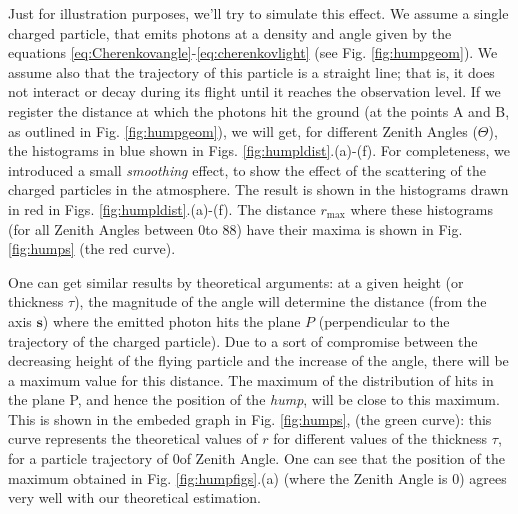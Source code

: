 Just for illustration purposes, we'll try to simulate this effect. We
assume a single charged particle, that emits \Cherenkov photons at a
density and angle given by the equations
\eqref{eq:Cherenkovangle}-\eqref{eq:cherenkovlight} (see Fig.
\ref{fig:humpgeom}). We assume also that the trajectory of this particle
is a straight line; that is, it does not interact or decay during its
flight until it reaches the observation level. If we register the
distance at which the photons hit the ground (at the points A and B,
as outlined in Fig. \ref{fig:humpgeom}), we will get, for different
Zenith Angles ($\Theta$), the histograms in blue shown in Figs.
\ref{fig:humpldist}.(a)-(f). For completeness, we introduced a small
\emph{smoothing} effect, to show the effect of the scattering of the
charged particles in the atmosphere.  The result is shown in the
histograms drawn in red in Figs. \ref{fig:humpldist}.(a)-(f). The
distance $r_{\text{max}}$ where these histograms (for all Zenith
Angles between 0\deg to 88\deg) have their maxima is shown in Fig.
\ref{fig:humps} (the red curve).

\humpfigsfig

One can get similar results by theoretical arguments: at a given
height (or thickness $\tau$), the magnitude of the \Cherenkov angle will
determine the distance (from the axis $\mathbf{s}$) where the emitted
photon hits the plane $P$ (perpendicular to the trajectory of the
charged particle).  Due to a sort of compromise between the decreasing
height of the flying particle and the increase of the \Cherenkov
angle, there will be a maximum value for this distance. The maximum of
the distribution of hits in the plane P, and hence the position of the
\emph{hump}, will be close to this maximum. This is shown in the
embeded graph in Fig.  \ref{fig:humps}, (the green curve): this curve
represents the theoretical values of $r$ for different values of the
thickness $\tau$, for a particle trajectory of 0\deg of Zenith Angle.
One can see that the position of the maximum obtained in Fig.
\ref{fig:humpfigs}.(a) (where the Zenith Angle is 0\deg) agrees very
well with our theoretical estimation.

\humpldistfig

\humpsfig


